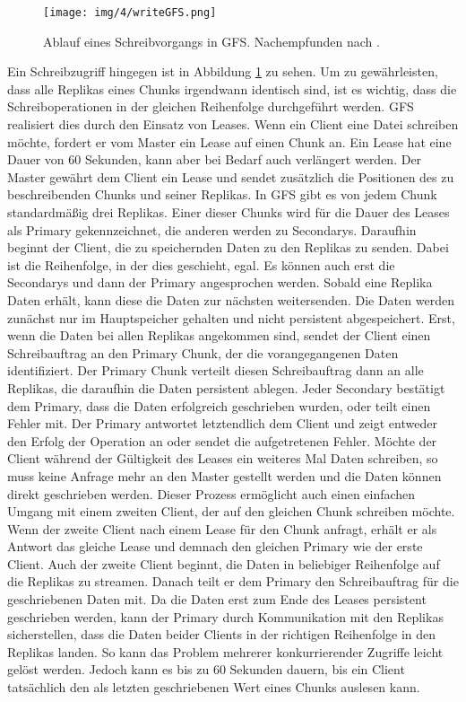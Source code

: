 \documentclass[12pt,oneside,a4paper,parskip]{scrbook}
\begin{document}
\begin{figure}[htb]
  \centering
  \texttt{[image: img/4/writeGFS.png]}
  \caption[Schreiben eines Chunks in GFS]{Ablauf eines Schreibvorgangs in GFS. Nachempfunden nach \cite{GFS}.}
  \label{writeGFS}
\end{figure}

Ein Schreibzugriff hingegen ist in Abbildung \ref{writeGFS} zu sehen. Um zu gewährleisten, dass alle Replikas eines Chunks irgendwann identisch sind, ist es wichtig, dass die Schreiboperationen in der gleichen Reihenfolge durchgeführt werden. GFS realisiert dies durch den Einsatz von Leases. Wenn ein Client eine Datei schreiben möchte, fordert er vom Master ein Lease auf einen Chunk an. Ein Lease hat eine Dauer von 60 Sekunden, kann aber bei Bedarf auch verlängert werden. Der Master gewährt dem Client ein Lease und sendet zusätzlich die Positionen des zu beschreibenden Chunks und seiner Replikas. In GFS gibt es von jedem Chunk standardmäßig drei Replikas. Einer dieser Chunks wird für die Dauer des Leases als Primary gekennzeichnet, die anderen werden zu Secondarys. Daraufhin beginnt der Client, die zu speichernden Daten zu den Replikas zu senden. Dabei ist die Reihenfolge, in der dies geschieht, egal. Es können auch erst die Secondarys und dann der Primary angesprochen werden. Sobald eine Replika Daten erhält, kann diese die Daten zur nächsten weitersenden. Die Daten werden zunächst nur im Hauptspeicher gehalten und nicht persistent abgespeichert. Erst, wenn die Daten bei allen Replikas angekommen sind, sendet der Client einen Schreibauftrag an den Primary Chunk, der die vorangegangenen Daten identifiziert. Der Primary Chunk verteilt diesen Schreibauftrag dann an alle Replikas, die daraufhin die Daten persistent ablegen. Jeder Secondary bestätigt dem Primary, dass die Daten erfolgreich geschrieben wurden, oder teilt einen Fehler mit. Der Primary antwortet letztendlich dem Client und zeigt entweder den Erfolg der Operation an oder sendet die aufgetretenen Fehler. Möchte der Client während der Gültigkeit des Leases ein weiteres Mal Daten schreiben, so muss keine Anfrage mehr an den Master gestellt werden und die Daten können direkt geschrieben werden. Dieser Prozess ermöglicht auch einen einfachen Umgang mit einem zweiten Client, der auf den gleichen Chunk schreiben möchte. Wenn der zweite Client nach einem Lease für den Chunk anfragt, erhält er als Antwort das gleiche Lease und demnach den gleichen Primary wie der erste Client. Auch der zweite Client beginnt, die Daten in beliebiger Reihenfolge auf die Replikas zu streamen. Danach teilt er dem Primary den Schreibauftrag für die geschriebenen Daten mit. Da die Daten erst zum Ende des Leases persistent geschrieben werden, kann der Primary durch Kommunikation mit den Replikas sicherstellen, dass die Daten beider Clients in der richtigen Reihenfolge in den Replikas landen. So kann das Problem mehrerer konkurrierender Zugriffe leicht gelöst werden. Jedoch kann es bis zu 60 Sekunden dauern, bis ein Client tatsächlich den als letzten geschriebenen Wert eines Chunks auslesen kann.
\end{document}

